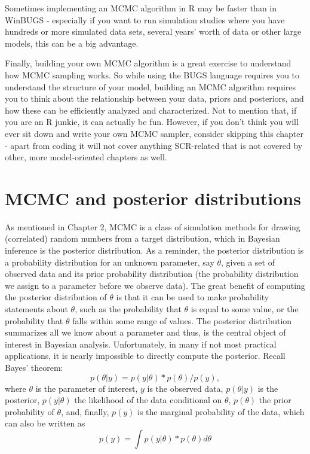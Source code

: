 Sometimes implementing an MCMC algorithm in R may be faster than in
WinBUGS - especially if you want to run simulation studies where you
have hundreds or more simulated data sets, several years' worth of
data or other large models, this can be a big advantage.

Finally, building your own MCMC algorithm is a great exercise to understand how MCMC sampling works. So while using the BUGS language requires you to understand the structure of your model, building an MCMC algorithm requires you to think about the relationship between your data, priors and posteriors, and how these can be efficiently analyzed and characterized. Not to mention that, if you are an R junkie, it can actually be fun.
However, if you don't think you will ever sit down and write your own
MCMC sampler, consider skipping this chapter - apart from coding it
will not cover anything SCR-related that is not covered by other, more
model-oriented chapters as well.


\section{MCMC and posterior distributions}

As mentioned in Chapter 2, MCMC is a class of simulation methods for
drawing (correlated) random numbers from a target distribution, which
in Bayesian inference is the posterior distribution.
As a reminder, the posterior distribution is a probability
distribution for an unknown parameter, say $\theta$, given a set of
observed data and its prior probability distribution (the probability
distribution we assign to a parameter before we observe data).  The
great benefit of computing the posterior distribution of $\theta$ is
that it can be used to make probability statements about $\theta$,
such as the probability that $\theta$ is equal to some value, or the
probability that $\theta$ falls within some range of values. 
The posterior distribution summarizes all we know about a parameter
and thus, is the central object of interest in Bayesian
analysis. Unfortunately, in many if not most practical applications,
it is nearly impossible to directly compute the posterior. Recall
Bayes’ theorem:
\begin{equation}
p(\theta|y) = p(y|\theta) * p(\theta) / p(y),
\label{mcmc.eq.bayes}
\end{equation}
where $\theta$ is the parameter of interest, $y$ is the observed data,
$p(\theta|y)$ is the posterior, $p(y|\theta)$ the likelihood of the
data conditional on $\theta$, $p(\theta)$ the prior probability of
$\theta$, and, finally, $p(y)$ is the marginal probability of the
data, which can also be written as
\[
p(y) = \int p(y|\theta) * p(\theta) d\theta
\]

